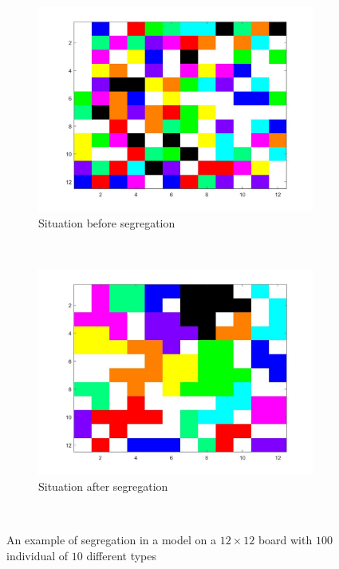 \begin{figure}[H]
	\centering
    \begin{subfigure}{0.45\textwidth}
        \includegraphics[width=\textwidth]{vb2beginbord.jpg}
        \caption{Situation before segregation}
        \label{fig:example big board begin}
    \end{subfigure}\hspace{0cm}
    ~ 
    \begin{subfigure}{0.45\textwidth}
        \includegraphics[width=\textwidth]{vb2eindbord.jpg}
        \caption{Situation after segregation}
        \label{fig:example big board end}
    \end{subfigure}
    ~ 
    \caption{An example of segregation in a model on a $12\times 12$ board with $100$ individual of $10$ different types}
    \label{fig:example big board}
\end{figure}

